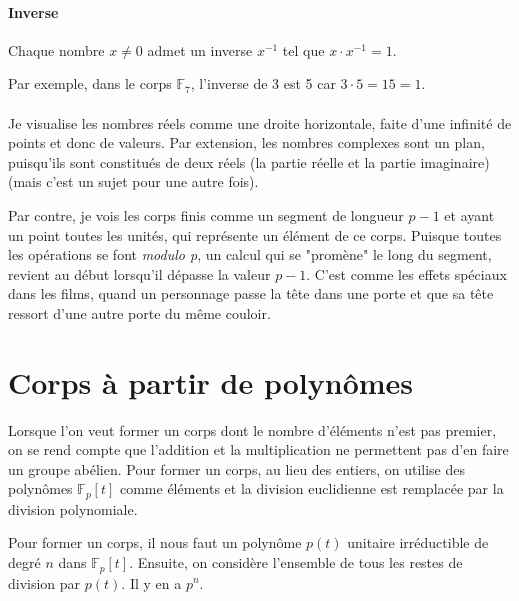 \documentclass[10pt,a4paper]{book}
\newcommand{\F}{\mathbb{F}}
\begin{document}
\paragraph{Inverse}
Chaque nombre $x\neq 0$ admet un inverse $x^{-1}$ tel que $x\cdot x^{-1}=1$.\par
Par exemple, dans le corps $\F_7$, l'inverse de 3 est 5 car $3\cdot 5=15=1$.

\paragraph{}
Je visualise les nombres réels comme une droite horizontale, faite d'une infinité de points et donc de valeurs. Par extension, les nombres complexes sont un plan, puisqu'ils sont constitués de deux réels (la partie réelle et la partie imaginaire)(mais c'est un sujet pour une autre fois). \par
Par contre, je vois les corps finis comme un segment de longueur $p-1$ et ayant un point toutes les unités, qui représente un élément de ce corps. Puisque toutes les opérations se font \textit{modulo p}, un calcul qui se "promène" le long du segment, revient au début lorsqu'il dépasse la valeur $p-1$. C'est comme les effets spéciaux dans les films, quand un personnage passe la tête dans une porte et que sa tête ressort d'une autre porte du même couloir.

\section{Corps à partir de polynômes}
Lorsque l'on veut former un corps dont le nombre d'éléments n'est pas premier, on se rend compte que l'addition et la multiplication ne permettent pas d'en faire un groupe abélien. Pour former un corps, au lieu des entiers, on utilise des polynômes $\F_p[t]$ comme éléments et la division euclidienne est remplacée par la division polynomiale.\par 
Pour former un corps, il nous faut un polynôme $p(t)$ unitaire irréductible de degré $n$ dans $\F_p[t]$. Ensuite, on considère l'ensemble de tous les restes de division par $p(t)$. Il y en a $p^n$.
\end{document}
